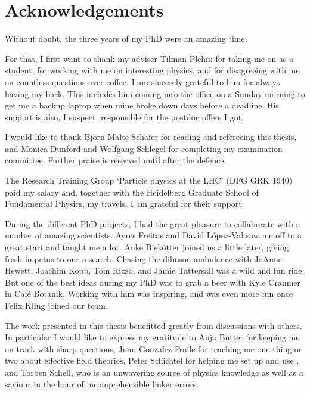 
\chapter*{Acknowledgements}

Without doubt, the three years of my PhD were an amazing time.

For that, I first want to thank my adviser Tilman Plehn: for taking me
on as a student, for working with me on interesting physics, and for
disagreeing with me on countless questions over coffee. I am sincerely
grateful to him for always having my back. This includes him coming
into the office on a Sunday morning to get me a backup laptop when
mine broke down days before a deadline. His support is also, I
suspect, responsible for the postdoc offers I got.
%
%

I would like to thank Bj\"orn Malte Sch\"afer for reading and
refereeing this thesis, and Monica Dunford and Wolfgang Schlegel for
completing my examination committee. Further praise is reserved until
after the defence.

The Research Training Group `Particle physics at the LHC' (DFG GRK
1940) paid my salary and, together with the Heidelberg Graduate School
of Fundamental Physics, my travels. I am grateful for their support.

During the different PhD projects, I had the great pleasure to
collaborate with a number of amazing scientists. Ayres Freitas and
David L\'opez-Val saw me off to a great start and taught me a
lot. Anke Biek\"otter joined us a little later, giving fresh impetus
to our research. Chasing the diboson ambulance with JoAnne Hewett,
Joachim Kopp, Tom Rizzo, and Jamie Tattersall was a wild and fun
ride. But one of the best ideas during my PhD was to grab a beer with
Kyle Cranmer in Caf\'e Botanik. Working with him was inspiring, and
was even more fun once Felix Kling joined our team.

The work presented in this thesis benefitted greatly from discussions
with others. In particular I would like to express my gratitude to
Anja Butter for keeping me on track with sharp questions, Juan
Gonzalez-Fraile for teaching me one thing or two about effective field
theories, Peter Schichtel for helping me set up and use
, and Torben Schell, who is an unwavering source of
physics knowledge as well as a saviour in the hour of incomprehensible
linker errors.

